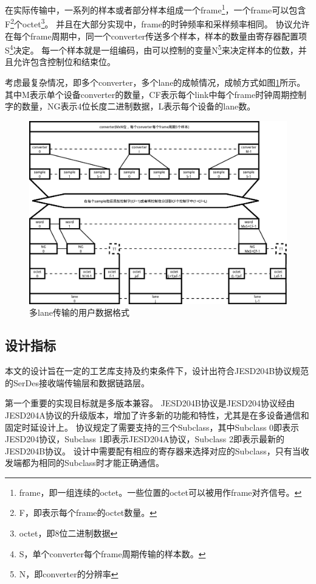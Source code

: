 \documentclass[UTF8]{ctexart}
\begin{document}
在实际传输中，一系列的样本或者部分样本组成一个frame\footnote{frame，即一组连续的octet。一些位置的octet可以被用作frame对齐信号。}，一个frame可以包含F\footnote{F，即表示每个frame的octet数量。}个octet\footnote{octet，即8位二进制数据}。
并且在大部分实现中，frame的时钟频率和采样频率相同。
协议允许在每个frame周期中，同一个converter传送多个样本，样本的数量由寄存器配置项S\footnote{S，单个converter每个frame周期传输的样本数。}决定。
每一个样本就是一组编码，由可以控制的变量N\footnote{N，即converter的分辨率}来决定样本的位数，并且允许包含控制位和结束位。

考虑最复杂情况，即多个converter，多个lane的成帧情况，成帧方式如图\ref{fig:user_data_format_for_multiple_lanes}所示。其中M表示单个设备converter的数量，CF表示每个link中每个frame时钟周期控制字的数量，NG表示4位长度二进制数据，L表示每个设备的lane数。

\begin{figure}[H]
\centering
\includegraphics[width=17cm]{./img/user_data_format_for_multiple_lanes.pdf}
\caption{多lane传输的用户数据格式}
\label{fig:user_data_format_for_multiple_lanes}
\end{figure}

\subsection{设计指标}

本文的设计旨在一定的工艺库支持及约束条件下，设计出符合JESD204B协议规范的SerDes接收端传输层和数据链路层。

第一个重要的实现目标就是多版本兼容。
JESD204B协议是JESD204协议经由JESD204A协议的升级版本，增加了许多新的功能和特性，尤其是在多设备通信和固定时延设计上。
协议规定了需要支持的三个Subclass，其中Subclass 0即表示JESD204协议，Subclass 1即表示JESD204A协议，Subclass 2即表示最新的JESD204B协议。
设计中需要配有相应的寄存器来选择对应的Subclass，只有当收发端都为相同的Subclass时才能正确通信。
\end{document}
